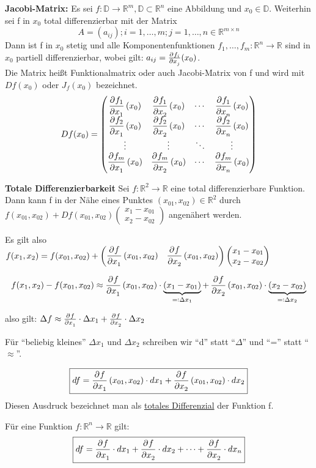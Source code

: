 \documentclass[fontset=ubuntu,12pt,a4paper,fleqn]{article}
\begin{document}
\begin{multicols}{2}
\textbf{Jacobi-Matrix:}
Es sei \(f:\mathbb{D}\to \mathbb{R}^m,\mathbb{D}\subset\mathbb{R}^n\) eine Abbildung und \(x_0\in\mathbb{D}\). Weiterhin sei f in \(x_0\) total differenzierbar mit der Matrix
\[A=(a_{ij});i=1,\dots,m;j=1,\dots,n \in\mathbb{R}^{m\times n}\]
Dann ist f in \(x_0\) stetig und alle Komponentenfunktionen \(f_1,\dots,f_m:\mathbb{R}^n\to\mathbb{R}\) sind in \(x_0\) partiell differenzierbar, wobei gilt: \(a_{ij}=\pd{f_i}{x_j}(x_0)\).\\
Die Matrix heißt Funktionalmatrix oder auch Jacobi-Matrix von f und wird mit \(Df(x_0)\) oder \(J_f(x_0)\) bezeichnet.
\[Df(x_0)=\begin{pmatrix}
\dpd{f_1}{x_1}(x_0) & \dpd{f_1}{x_2}(x_0) & \cdots & \dpd{f_1}{x_n}(x_0) \\
\dpd{f_2}{x_1}(x_0) & \dpd{f_2}{x_2}(x_0) & \cdots & \dpd{f_2}{x_n}(x_0) \\
\vdots & \vdots & \ddots & \vdots \\
\dpd{f_m}{x_1}(x_0) & \dpd{f_m}{x_2}(x_0) & \cdots & \dpd{f_m}{x_n}(x_0)
\end{pmatrix}\]
\end{multicols}
\textbf{Totale Differenzierbarkeit}
Sei \(f:\mathbb{R}^2\to\mathbb{R}\) eine total differenzierbare Funktion. Dann kann f in der Nähe eines Punktes \((x_{01},x_{02})\in\mathbb{R}^2\) durch \(f(x_{01},x_{02})+Df(x_{01},x_{02})\begin{pmatrix}x_1-x_{01} \\ x_2-x_{02}\end{pmatrix}\) angenähert werden.

Es gilt also \(f(x_1,x_2)=f(x_{01},x_{02})+\begin{pmatrix}
\dpd{f}{x_1}(x_{01},x_{02}) & \dpd{f}{x_2}(x_{01},x_{02})\end{pmatrix}\begin{pmatrix}
x_1-x_{01} \\ x_2-x_{02}
\end{pmatrix}\)

\[f(x_1,x_2)-f(x_{01},x_{02})\approx\dpd{f}{x_1}(x_{01},x_{02})\cdot\underbrace{(x_1-x_{01})}_{=:\Delta x_1} + \dpd{f}{x_2}(x_{01},x_{02})\cdot\underbrace{(x_2-x_{02})}_{=:\Delta x_2}\]

also gilt: \(\Delta f\approx \pd{f}{x_1}\cdot\Delta x_1 + \pd{f}{x_2}\cdot\Delta x_2\)

Für \enquote{beliebig kleines} \(\Delta x_1\) und \(\Delta x_2\) schreiben wir \enquote{d} statt \enquote{\(\Delta\)} und \enquote{=} statt \enquote{\(\approx\)}.

\[\boxed{df = \dpd{f}{x_1}(x_{01},x_{02})\cdot dx_1 + \dpd{f}{x_2}(x_{01},x_{02})\cdot dx_2} \]
Diesen Ausdruck bezeichnet man als \underline{totales Differenzial} der Funktion f.

Für eine Funktion \(f:\mathbb{R}^n\to\mathbb{R}\) gilt:
\[\boxed{df = \dpd{f}{x_1}\cdot dx_1 + \dpd{f}{x_2}\cdot dx_2 + \cdots + \dpd{f}{x_2}\cdot dx_n}\]



    
\end{document}
